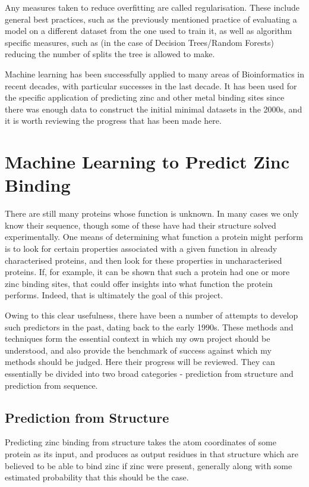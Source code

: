 Any measures taken to reduce overfitting are called regularisation. These include general best practices, such as the previously mentioned practice of evaluating a model on a different dataset from the one used to train it, as well as algorithm specific measures, such as (in the case of Decision Trees/Random Forests) reducing the number of splits the tree is allowed to make.

Machine learning has been successfully applied to many areas of Bioinformatics in recent decades, with particular successes in the last decade. It has been used for the specific application of predicting zinc and other metal binding sites since there was enough data to construct the initial minimal datasets in the 2000s, and it is worth reviewing the progress that has been made here.

\section{Machine Learning to Predict Zinc Binding}

There are still many proteins whose function is unknown. In many cases we only know their sequence, though some of these have had their structure solved experimentally. One means of determining what function a protein might perform is to look for certain properties associated with a given function in already characterised proteins, and then look for these properties in uncharacterised proteins. If, for example, it can be shown that such a protein had one or more zinc binding sites, that could offer insights into what function the protein performs. Indeed, that is ultimately the goal of this project.

Owing to this clear usefulness, there have been a number of attempts to develop such predictors in the past, dating back to the early 1990s. These methods and techniques form the essential context in which my own project should be understood, and also provide the benchmark of success against which my methods should be judged. Here their progress will be reviewed. They can essentially be divided into two broad categories - prediction from structure and prediction from sequence.

\subsection{Prediction from Structure}

Predicting zinc binding from structure takes the atom coordinates of some protein as its input, and produces as output residues in that structure which are believed to be able to bind zinc if zinc were present, generally along with some estimated probability that this should be the case.

